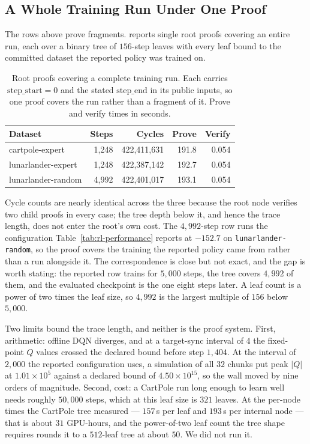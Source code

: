 \subsection{A Whole Training Run Under One Proof}

The rows above prove fragments.  reports single root proofs
covering an entire run, each over a binary tree of $156$-step leaves with every
leaf bound to the committed dataset the reported policy was trained on.

\begin{table}[!t]
\centering
\footnotesize
\setlength{\tabcolsep}{4pt}
\caption{Root proofs covering a complete training run. Each carries
$\mathrm{step\_start} = 0$ and the stated $\mathrm{step\_end}$ in its public
inputs, so one proof covers the run rather than a fragment of it. Prove and
verify times in seconds.}
\label{tab:whole-run}
\begin{tabular}{@{}lrrrr@{}}
\toprule
\textbf{Dataset} & \textbf{Steps} & \textbf{Cycles} &
\textbf{Prove} & \textbf{Verify} \\
\midrule
cartpole-expert & 1{,}248 & 422{,}411{,}631 & 191.8 & 0.054 \\
lunarlander-expert & 1{,}248 & 422{,}387{,}142 & 192.7 & 0.054 \\
lunarlander-random & 4{,}992 & 422{,}401{,}017 & 193.1 & 0.054 \\
\bottomrule
\end{tabular}
\end{table}

Cycle counts are nearly identical across the three because the root node
verifies two child proofs in every case; the tree depth below it, and hence the
trace length, does not enter the root's own cost. The $4{,}992$-step row runs
the configuration Table~\ref{tab:rl-performance} reports at $-152.7$ on
\texttt{lunarlander-random}, so the proof covers the training the reported
policy came from rather than a run alongside it. The correspondence is close
but not exact, and the gap is worth stating: the reported row trains for
$5{,}000$ steps, the tree covers $4{,}992$ of them, and the evaluated
checkpoint is the one eight steps later. A leaf count is a power of two times
the leaf size, so $4{,}992$ is the largest multiple of $156$ below $5{,}000$.

Two limits bound the trace length, and neither is the proof system. First,
arithmetic: offline DQN diverges, and at a target-sync interval of $4$ the
fixed-point $Q$ values crossed the declared bound before step $1{,}404$. At the
interval of $2{,}000$ the reported configuration uses, a simulation of all
$32$ chunks put peak $|Q|$ at $1.01\times 10^{5}$ against a declared bound of
$4.50\times 10^{15}$, so the wall moved by nine orders of magnitude. Second,
cost: a CartPole run long enough to learn well needs roughly $50{,}000$ steps,
which at this leaf size is $321$ leaves. At the per-node times the CartPole
tree measured --- $157$\,s per leaf and $193$\,s per internal node --- that is
about $31$ GPU-hours, and the power-of-two leaf count the tree shape requires
rounds it to a $512$-leaf tree at about $50$. We did not run it.

